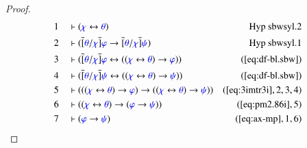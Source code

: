\begin{proof}
\begin{align}
  1 &&  & \vdash ( \mw{\chi} \leftrightarrow \mw{\theta}
      )&\text{Hyp~sbwsyl.2}\notag%
  \\ 2 &&  & \vdash ( \overline{[} \mw{\theta} / \mw{\chi} \overline{]}
      \mw{\varphi} \rightarrow \overline{[} \mw{\theta} /
      \mw{\chi} \overline{]} \mw{\psi}
      )&\text{Hyp~sbwsyl.1}\notag%
  \\ 3 &&  & \vdash ( \overline{[} \mw{\theta} / \mw{\chi} \overline{]}
      \mw{\varphi} \leftrightarrow ( ( \mw{\chi}
      \leftrightarrow \mw{\theta} ) \rightarrow
      \mw{\varphi} ) )&(\mbox{\ref{eq:df-bl.sbw}})\notag
  \\ 4 &&  & \vdash ( \overline{[} \mw{\theta} / \mw{\chi} \overline{]}
      \mw{\psi} \leftrightarrow ( ( \mw{\chi}
      \leftrightarrow \mw{\theta} ) \rightarrow \mw{\psi} )
      )&(\mbox{\ref{eq:df-bl.sbw}})\notag
  \\ 5 &&  & \vdash ( ( ( \mw{\chi} \leftrightarrow \mw{\theta} ) \rightarrow
      \mw{\varphi} ) \rightarrow ( ( \mw{\chi}
      \leftrightarrow \mw{\theta} ) \rightarrow \mw{\psi} )
      )&(\mbox{\ref{eq:3imtr3i}},2,3,4)\notag
  \\ 6 &&  & \vdash ( ( \mw{\chi} \leftrightarrow \mw{\theta} ) \rightarrow (
      \mw{\varphi} \rightarrow \mw{\psi} )
      )&(\mbox{\ref{eq:pm2.86i}},5)\notag
  \\ 7 &&  & \vdash ( \mw{\varphi} \rightarrow \mw{\psi}
      )&(\mbox{\ref{eq:ax-mp}},1,6)\notag
\end{align}
\end{proof}

